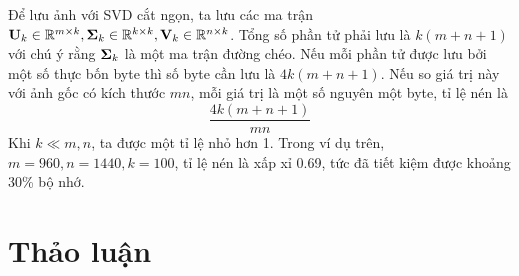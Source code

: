 Để lưu ảnh với SVD cắt ngọn, ta lưu các ma trận $\mathbf{U}_k \in
\mathbb{R}^{m \times k}, \mathbf{\Sigma}_k \in \mathbb{R}^{k \times k}, \mathbf{V}_k \in
\mathbb{R}^{n \times k}$. Tổng số phần tử phải lưu là $k(m + n + 1)$ với chú ý
rằng $\mathbf{\Sigma}_k$ là một ma trận đường chéo. Nếu mỗi phần
tử được lưu bởi một số thực bốn byte thì số byte cần lưu là $4k(m + n + 1)$. Nếu so giá trị này với ảnh gốc có kích thước $mn$, mỗi giá trị là một số
nguyên một byte, tỉ lệ nén là
\begin{equation}
\frac{4k(m + n + 1)}{mn}
\end{equation}
Khi $k \ll m, n$, ta được một tỉ lệ nhỏ hơn 1. Trong ví dụ trên, $m =
960, n = 1440, k = 100$, tỉ lệ nén là xấp xỉ 0.69, tức đã tiết kiệm được
khoảng 30\% bộ nhớ.










\section{Thảo luận}

